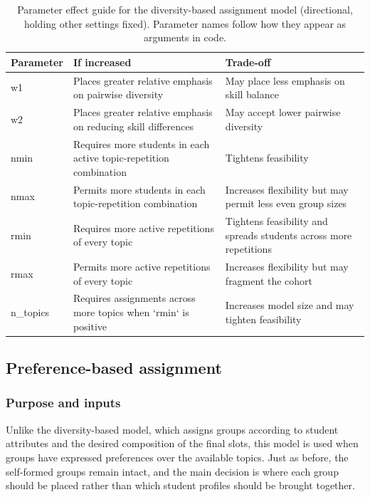 \begin{table}[!h]
\centering
\caption{\label{tab:dba-param-guide}Parameter effect guide for the diversity-based assignment model (directional, holding other settings fixed).  Parameter names follow how they appear as arguments in code.}
\centering
\fontsize{9}{11}\selectfont
\begin{tabular}[t]{>{\raggedright\arraybackslash}p{2cm}>{\raggedright\arraybackslash}p{5.5cm}>{\raggedright\arraybackslash}p{5.5cm}}
\toprule
Parameter & If increased & Trade-off\\
\midrule
w1 & Places greater relative emphasis on pairwise diversity & May place less emphasis on skill balance\\
w2 & Places greater relative emphasis on reducing skill differences & May accept lower pairwise diversity\\
nmin & Requires more students in each active topic-repetition combination & Tightens feasibility\\
nmax & Permits more students in each topic-repetition combination & Increases flexibility but may permit less even group sizes\\
rmin & Requires more active repetitions of every topic & Tightens feasibility and spreads students across more repetitions\\
\addlinespace
rmax & Permits more active repetitions of every topic & Increases flexibility but may fragment the cohort\\
n\_topics & Requires assignments across more topics when `rmin` is positive & Increases model size and may tighten feasibility\\
\bottomrule
\end{tabular}
\end{table}

\subsection{Preference-based assignment}\label{preference-based-assignment}

\subsubsection{Purpose and inputs}\label{purpose-and-inputs-1}

Unlike the diversity-based model, which assigns groups according to student
attributes and the desired composition of the final slots, this model is used
when groups have expressed preferences over the available topics. Just as
before, the self-formed groups remain intact, and the main decision is where
each group should be placed rather than which student profiles should be
brought together.


